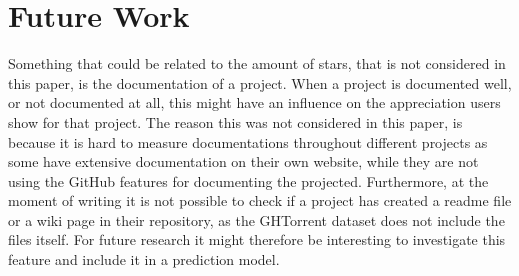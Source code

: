 \section{Future Work}
Something that could be related to the amount of stars, that is not considered in this paper, is the documentation of a project.
When a project is documented well, or not documented at all, this might have an influence on the appreciation users show for that project.
The reason this was not considered in this paper, is because it is hard to measure documentations throughout different projects as some have extensive documentation on their own website, while they are not using the GitHub features for documenting the projected.
Furthermore, at the moment of writing it is not possible to check if a project has created a readme file or a wiki page in their repository, as the GHTorrent dataset does not include the files itself. For future research it might therefore be interesting to investigate this feature and include it in a prediction model.


